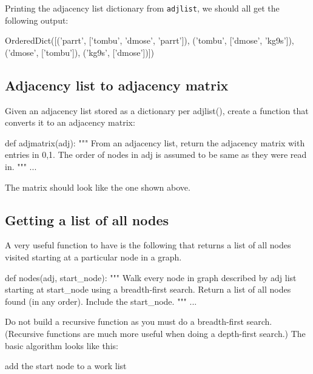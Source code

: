 \begin{fullwidth}
\noindent Printing the adjacency list dictionary from {\tt adjlist}, we should all get the following output:

\begin{pyverbatim}
OrderedDict([('parrt', ['tombu', 'dmose', 'parrt']),
 ('tombu', ['dmose', 'kg9s']), 
 ('dmose', ['tombu']), 
 ('kg9s', ['dmose'])])
\end{pyverbatim}

\subsection{Adjacency list to adjacency matrix}

Given an adjacency list stored as a dictionary per adjlist(), create a function that converts it to an adjacency matrix:
 
\begin{pyverbatim}
def adjmatrix(adj):
    """
    From an adjacency list, return the adjacency matrix with entries in {0,1}.
    The order of nodes in adj is assumed to be same as they were read in.
    """
    ...
\end{pyverbatim}

\noindent The matrix should look like the one shown above.

\subsection{Getting a list of all nodes}

A very useful function to have is the following that returns a list of all nodes visited starting at a particular node in a graph. 
 
\begin{pyverbatim}
def nodes(adj, start_node):
    """
    Walk every node in graph described by adj list starting at start_node
    using a breadth-first search.  Return a list of all nodes found (in
    any order). Include the start_node.
    """
    ...
\end{pyverbatim}

\noindent Do not build a recursive function as you must do a breadth-first search. (Recursive functions are much more useful when doing a depth-first search.) The basic algorithm looks like this:

\begin{algorithm}[H]
\SetInd{.3em}{.3em}
add the start node to a work list\;
\;
\end{algorithm}


\end{fullwidth}
